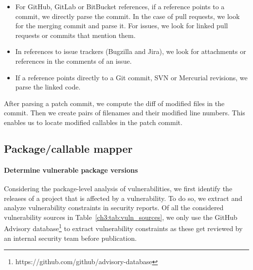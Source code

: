 \begin{itemize}
	\item For GitHub, GitLab or BitBucket references, if a reference points to a commit, we directly parse the commit. In the case of pull requests, we look for the merging commit and parse it. For issues, we look for linked pull requests or commits that mention them.
	\item In references to issue trackers (Bugzilla and Jira), we look for attachments or references in the comments of an issue.
	\item If a reference points directly to a Git commit, SVN or Mercurial revisions, we parse the linked code.
\end{itemize}

After parsing a patch commit, we compute the diff of modified files in the commit. Then we create pairs of filenames and their modified line numbers. This enables us to locate modified callables in the patch commit.

\subsection{Package/callable mapper}
\paragraph{Determine vulnerable package versions}\label{subsec:det-pkg-vuln}
Considering the package-level analysis of vulnerabilities, we first identify the releases of a project that is affected by a vulnerability.
To do so, we extract and analyze vulnerability constraints in security reports.
Of all the considered vulnerability sources in Table~\ref{ch3:tab:vuln_sources}, we only use the GitHub Advisory database\footnote{https://github.com/github/advisory-database} to extract vulnerability constraints as these get reviewed by an internal security team before publication.

